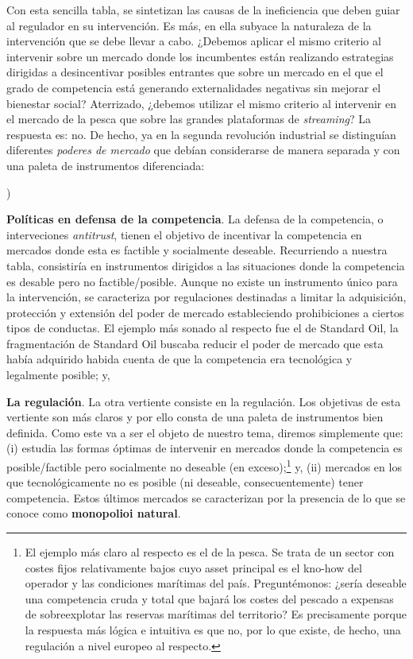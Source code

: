 \documentclass[10pt,a4paper]{article}
\newcounter{alphaitem}
\newenvironment{la}
      {\begin{list}{\alph{alphaitem})}{%
          \usecounter{alphaitem}%
          \setlength{\leftmargin}{1cm}%
          \setlength{\parskip}{3pt}%
          \setlength{\itemsep}{0pt}%
          \setlength{\parsep}{0pt}%
      }}
      {\end{list}}
\begin{document}
Con esta sencilla tabla, se sintetizan las causas de la ineficiencia que deben guiar al regulador en su intervención. Es más, en ella subyace la naturaleza de la intervención que se debe llevar a cabo. ¿Debemos aplicar el mismo criterio al intervenir sobre un mercado donde los incumbentes están realizando estrategias dirigidas a desincentivar posibles entrantes que sobre un mercado en el que el grado de competencia está generando externalidades negativas sin mejorar el bienestar social? Aterrizado, ¿debemos utilizar el mismo criterio al intervenir en el mercado de la pesca que sobre las grandes plataformas de \textit{streaming}? La respuesta es: no. De hecho, ya en la segunda revolución industrial se distinguían diferentes \textit{poderes de mercado} que debían considerarse de manera separada y con una paleta de instrumentos diferenciada:
\begin{la}
    \item \textbf{Políticas en defensa de la competencia}. La defensa de la competencia, o interveciones \textit{antitrust}, tienen el objetivo de incentivar la competencia en mercados donde esta es factible y socialmente deseable. Recurriendo a nuestra tabla, consistiría en instrumentos dirigidos a las situaciones donde la competencia es desable pero no factible/posible. Aunque no existe un instrumento único para la intervención, se caracteriza por regulaciones destinadas a limitar la adquisición, protección y extensión del poder de mercado estableciendo prohibiciones a ciertos tipos de conductas. El ejemplo más sonado al respecto fue el de Standard Oil, la fragmentación de Standard Oil buscaba reducir el poder de mercado que esta había adquirido habida cuenta de que la competencia era tecnológica y legalmente posible; y,
    \item \textbf{La regulación}. La otra vertiente consiste en la regulación. Los objetivas de esta vertiente son más claros y por ello consta de una paleta de instrumentos bien definida. Como este va a ser el objeto de nuestro tema, diremos simplemente que: (i) estudia las formas óptimas de intervenir en mercados donde la competencia es posible/factible pero socialmente no deseable (en exceso);\footnote{%
        El ejemplo más claro al respecto es el de la pesca. Se trata de un sector con costes fijos relativamente bajos cuyo asset principal es el kno-how del operador y las condiciones marítimas del país. Preguntémonos: ¿sería deseable una competencia cruda y total que bajará los costes del pescado a expensas de sobreexplotar las reservas marítimas del territorio? Es precisamente porque la respuesta más lógica e intuitiva es que no, por lo que existe, de hecho, una regulación a nivel europeo al respecto.
    } y, (ii) mercados en los que tecnológicamente no es posible (ni deseable, consecuentemente) tener competencia. Estos últimos mercados se caracterizan por la presencia de lo que se conoce como \textbf{monopolioi natural}.
\end{la}
\end{document}
